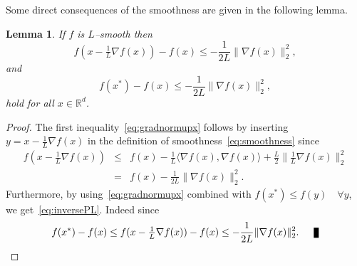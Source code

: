\documentclass[11pt]{article}
\newcommand{\R}{\mathbb{R}}
\newcommand{\qed}{\nobreak \ifvmode \relax \else
      \ifdim\lastskip<1.5em \hskip-\lastskip
      \hskip1.5em plus0em minus0.5em \fi \nobreak
      \vrule height0.75em width0.5em depth0.25em\fi}
\newcommand{\norm}[1]{\lVert#1\rVert}
\newtheorem{lemma}{Lemma}[section]
\begin{document}
Some direct consequences of the smoothness are given in the following lemma.
\begin{lemma} If $f$ is $L$--smooth then
\begin{equation}\label{eq:gradnormupx}
f(x - \tfrac{1}{L} \nabla f(x))-f(x) \leq  -  \frac{1}{2L}\norm{\nabla f(x)}_2^2, 
\end{equation}
and
\begin{equation}\label{eq:inversePL}
 f(x^*) - f(x) \leq -\frac{1}{2L} \norm{\nabla f(x)}_2^2,
\end{equation}
hold for all $x \in \R^d$.
\end{lemma}
\begin{proof}
The first inequality~\eqref{eq:gradnormupx} follows by inserting $y = x - \tfrac{1}{L} \nabla f(x)$ in the definition of smoothness~\eqref{eq:smoothness} since
\begin{eqnarray}
 f(x - \tfrac{1}{L} \nabla f(x)) &\leq & f(x) -  \tfrac{1}{L}\langle \nabla f(x),   \nabla f(x) \rangle + \frac{L}{2} \norm{ \tfrac{1}{L} \nabla f(x)}_2^2\nonumber\\
 & =& f(x) -  \frac{1}{2L}\norm{\nabla f(x)}_2^2.\nonumber
 \end{eqnarray}
Furthermore, by using~\eqref{eq:gradnormupx} combined with   $f(x^*) \leq f(y)\quad \forall y$, we get~\eqref{eq:inversePL}.
Indeed since
 \begin{equation}\label{eq:gradnormup}
f(x^*) -f(x) \leq f(x - \tfrac{1}{L} \nabla f(x))-f(x) \leq  -  \frac{1}{2L}\norm{\nabla f(x)}_2^2. \qed
\end{equation}
\end{proof}
\end{document}
